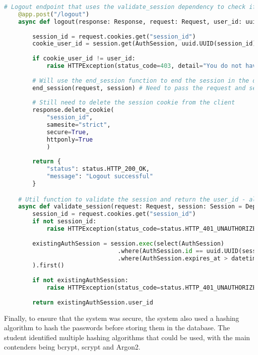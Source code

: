 \begin{lstlisting}[language=Python, caption=FastAPI Dependency for Session Validation]
    # Logout endpoint that uses the validate_session dependency to check if the user is authenticated
    @app.post("/logout")
    async def logout(response: Response, request: Request, user_id: uuid.UUID = Depends(validate_session), session: Session = Depends(get_session)):
        
        session_id = request.cookies.get("session_id")
        cookie_user_id = session.get(AuthSession, uuid.UUID(session_id)).user_id
        
        if cookie_user_id != user_id:
            raise HTTPException(status_code=403, detail="You do not have permission to log out this user")
        
        # Will use the end_session function to end the session in the database
        end_session(request, session) # Need to pass the request and session to the function, otherwise it will not work
        
        # Still need to delete the session cookie from the client
        response.delete_cookie(
            "session_id",
            samesite="strict",
            secure=True,
            httponly=True
            )
        
        return {
            "status": status.HTTP_200_OK,
            "message": "Logout successful"
        }

    # Util function to validate the session and return the user_id - also used as a dependency for protected routes
    async def validate_session(request: Request, session: Session = Depends(get_session)):
        session_id = request.cookies.get("session_id")
        if not session_id:
            raise HTTPException(status_code=status.HTTP_401_UNAUTHORIZED, detail="Session cookie not found")
            
        existingAuthSession = session.exec(select(AuthSession)
                                .where(AuthSession.id == uuid.UUID(session_id))
                                .where(AuthSession.expires_at > datetime.now())
        ).first()
            
        if not existingAuthSession:
            raise HTTPException(status_code=status.HTTP_401_UNAUTHORIZED, detail="Session not found")
            
        return existingAuthSession.user_id
\end{lstlisting}

Finally, to ensure that the system was secure, the system also used a hashing algorithm to hash the passwords before storing them in the database. The student identified multiple hashing algorithms that could be used, with the main contenders being bcrypt, scrypt and Argon2. %

